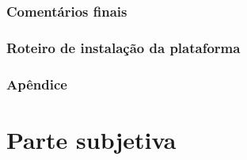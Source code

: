 \documentclass[a4paper,12pt,titlepage]{article}
\begin{document}
\section{Comentários finais} \label{comentarios}

\newpage

%
%
\newpage

\section{Roteiro de instalação da plataforma} \label{instalacao}

\newpage

\section{Apêndice} \label{apendice}

\newpage

\part{Parte subjetiva}

\newpage 
\end{document}
